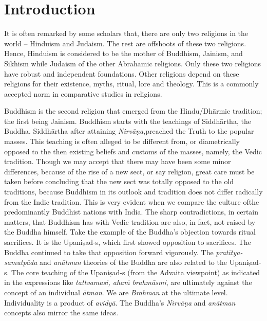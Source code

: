 \section*{Introduction}

It is often remarked by some scholars that, there are only two religions in the world – Hinduism and Judaism. The rest are offshoots of these two religions. Hence, Hinduism is considered to be the mother of Buddhism, Jainism, and Sikhism while Judaism of the other Abrahamic religions. Only these two religions have robust and independent foundations. Other religions depend on these religions for their existence, myths, ritual, lore and theology. This is a commonly accepted norm in comparative studies in religions.

Buddhism is the second religion that emerged from the Hindu/Dhārmic tradition; the first being Jainism. Buddhism starts with the teachings of Siddhārtha, the Buddha. Siddhārtha after attaining \textit{Nirvāṇa},\break preached the Truth to the popular masses. This teaching is often alleged to be different from, or diametrically opposed to the then existing beliefs and customs of the masses, namely, the Vedic tradition. Though we may accept that there may have been some minor differences, because of the rise of a new sect, or say religion, great care must be taken before concluding that the new sect was totally opposed to the old traditions, because Buddhism in its outlook and tradition does not differ radically from the Indic tradition. This is very evident when we compare the culture ofthe predominantly Buddhist nations with India. The sharp contradictions, in certain matters, that Buddhism has with Vedic tradition are also, in fact, not raised by the Buddha himself. Take the example of the Buddha’s objection towards ritual sacrifices. It is the Upaniṣad-s, which first showed opposition to sacrifices. The Buddha continued to take that opposition forward vigorously. The \textit{pratītya-samutpāda} and \textit{anātman} theories of the Buddha are also related to the Upaniṣad-s. The core teaching of the Upaniṣad-s (from the Advaita viewpoint) as indicated in the expressions like \textit{tattvamasi, ahaṁ brahmāsmi}, are ultimately against the concept of an individual \textit{ātman}. We are \textit{Brahman} at the ultimate level. Individuality is a product of \textit{avidyā}. The Buddha’s \textit{Nirvāṇa} and \textit{anātman} concepts also mirror the same ideas.

